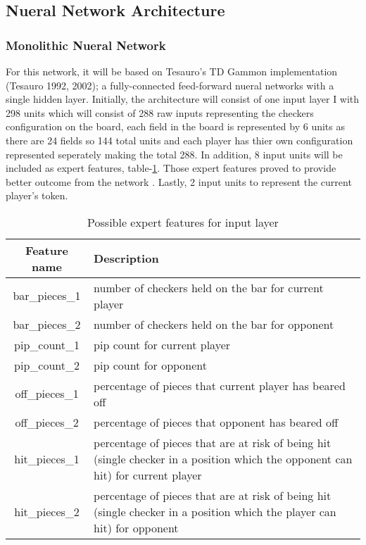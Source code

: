\documentclass[12pt,a4paper]{article}
\begin{document}
\subsection{Nueral Network Architecture} \label{modnet}
\subsubsection{Monolithic Nueral Network}
For this network, it will be based on Tesauro's TD Gammon implementation (Tesauro 1992, 2002); a fully-connected feed-forward nueral networks with a single hidden layer. Initially, the architecture will consist of one input layer I with 298 units which will consist of 288 raw inputs representing the checkers configuration on the board, each field in the board is represented by 6 units as there are 24 fields so 144 total units and each player has thier own configuration represented seperately making the total 288. In addition, 8 input units will be included as expert features, table-\ref{exfeat}. Those expert features proved to provide better outcome from the network \cite{}. Lastly, 2 input units to represent the current player's token. 
\begin{table}[htb]
    \centering
    \caption{Possible expert features for input layer}
    \vspace*{6pt}
    \label{exfeat}
    \begin{tabular}{cp{12cm}}
        \hline
        \hline
        Feature name & Description \\ 
        \hline
        bar\_pieces\_1 & number of checkers held on the bar for current player\\
        \hline
        bar\_pieces\_2 & number of checkers held on the bar for opponent\\
        \hline
        pip\_count\_1 & pip count for current player \\
        \hline
        pip\_count\_2 & pip count for opponent \\
        \hline
        off\_pieces\_1 & percentage of pieces that current player has beared off \\
        \hline
        off\_pieces\_2 & percentage of pieces that opponent has beared off \\
        \hline
        hit\_pieces\_1 & percentage of pieces that are at risk of being hit (single checker in a position which the opponent can hit) for current player \\
        \hline
        hit\_pieces\_2 & percentage of pieces that are at risk of being hit (single checker in a position which the player can hit) for opponent\\
        \hline
    \end{tabular}
\end{table}
\end{document}
